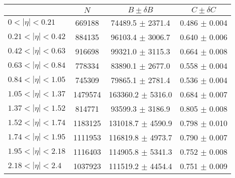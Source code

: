 \begin{tabular}{lccc}
\hline
    &   $N$   & $B \pm \delta B$  &  $C \pm \delta C$ \\
\hline
$0 < |\eta| <0.21$             & 669188     & 74489.5    $\pm$ 2371.4 & 0.486      $\pm$ 0.004 \\
$0.21 < |\eta| <0.42$          & 884135     & 96103.4    $\pm$ 3006.7 & 0.640      $\pm$ 0.006 \\
$0.42 < |\eta| <0.63$          & 916698     & 99321.0    $\pm$ 3115.3 & 0.664      $\pm$ 0.008 \\
$0.63 < |\eta| <0.84$          & 778334     & 83890.1    $\pm$ 2677.0 & 0.558      $\pm$ 0.004 \\
$0.84 < |\eta| <1.05$          & 745309     & 79865.1    $\pm$ 2781.4 & 0.536      $\pm$ 0.004 \\
$1.05 < |\eta| <1.37$          & 1479574    & 163360.2   $\pm$ 5316.0 & 0.684      $\pm$ 0.007 \\
$1.37 < |\eta| <1.52$          & 814771     & 93599.3    $\pm$ 3186.9 & 0.805      $\pm$ 0.008 \\
$1.52 < |\eta| <1.74$          & 1183125    & 131018.7   $\pm$ 4590.9 & 0.798      $\pm$ 0.010 \\
$1.74 < |\eta| <1.95$          & 1111953    & 116819.8   $\pm$ 4973.7 & 0.790      $\pm$ 0.007 \\
$1.95 < |\eta| <2.18$          & 1116403    & 114905.8   $\pm$ 5341.3 & 0.752      $\pm$ 0.008 \\
$2.18 < |\eta| <2.4$           & 1037923    & 111519.2   $\pm$ 4454.4 & 0.751      $\pm$ 0.009 \\
\hline
\end{tabular}
